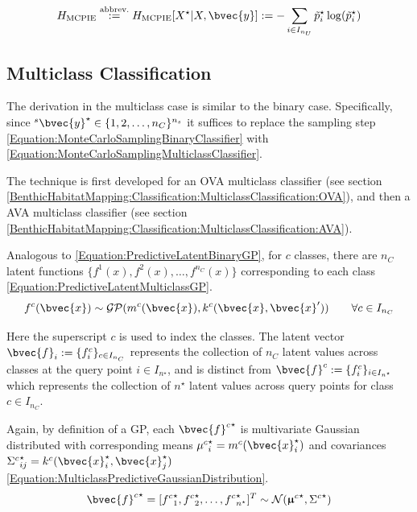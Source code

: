 			\begin{equation}
				H_{\mathrm{MCPIE}} \stackrel{\text{abbrev.}}{:=} H_{\mathrm{MCPIE}}[X^{\star} | X, \bvec{y}] := - \sum_{i \in I_{n_{U}}} \tilde{p}^{\star}_{i} \log(\tilde{p}^{\star}_{i})
			\label{Equation:MCPIE}
			\end{equation}		
			
		\subsection{Multiclass Classification}
		\label{InformativeSeafloorExploration:MCPIE:Multiclass}
		
			The derivation in the multiclass case is similar to the binary case. Specifically, since ${^{s}}\bvec{y}^{\star} \in \{1, 2, \dots, n_{C}\}^{n_{s}}$ it suffices to replace the sampling step \eqref{Equation:MonteCarloSamplingBinaryClassifier} with \eqref{Equation:MonteCarloSamplingMulticlassClassifier}.
			
			The technique is first developed for an OVA multiclass classifier (see section \ref{BenthicHabitatMapping:Classification:MulticlassClassification:OVA}), and then a AVA multiclass classifier (see section \ref{BenthicHabitatMapping:Classification:MulticlassClassification:AVA}). 
			
			Analogous to \eqref{Equation:PredictiveLatentBinaryGP}, for $c$ classes, there are $n_{C}$ latent functions $\{f^{1}(x), f^{2}(x), \dots, f^{n_{C}}(x)\}$ corresponding to each class \eqref{Equation:PredictiveLatentMulticlassGP}. \begin{equation}
				f^{c}(\bvec{x}) \sim \mathcal{GP}(m^{c}(\bvec{x}), k^{c}(\bvec{x}, \bvec{x}')) \qquad \forall c \in I_{n_{C}}
			\label{Equation:PredictiveLatentMulticlassGP}
			\end{equation}
						
			Here the superscript $c$ is used to index the classes. The latent vector $\bvec{f}_{i} := \{f^{c}_{i}\}_{c \in I_{n_{C}}}$ represents the collection of $n_{C}$ latent values across classes at the query point $i \in I_{n^{\star}}$, and is distinct from $\bvec{f}^{c} := \{f^{c}_{i}\}_{i \in I_{n^{\star}}}$ which represents the collection of $n^{\star}$ latent values across query points for class $c \in I_{n_{C}}$.
			
			Again, by definition of a GP, each ${\bvec{f}^{c}}^{\star}$ is multivariate Gaussian distributed with corresponding means ${\mu^{c}}^{\star}_{i} = m^{c}(\bvec{x}^{\star}_{i})$ and covariances ${\Sigma^{c}}^{\star}_{ij} = k^{c}(\bvec{x}^{\star}_{i}, \bvec{x}^{\star}_{j})$ \eqref{Equation:MulticlassPredictiveGaussianDistribution}. \begin{equation}
				{\bvec{f}^{c}}^{\star} = [{f^{c}}^{\star}_{1}, {f^{c}}^{\star}_{2}, \dots, {f^{c}}^{\star}_{n^{\star}}]^{T} \sim \mathcal{N}({\vec{\upmu}^{c}}^{\star}, {\Sigma^{c}}^{\star})
			\label{Equation:MulticlassPredictiveGaussianDistribution}
			\end{equation}
			
